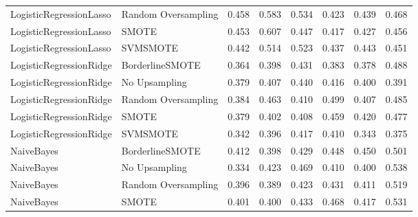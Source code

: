 \begin{tabular}{llllllll}
     LogisticRegressionLasso & Random Oversampling & 0.458 &                     0.583 &                 0.534 &                  0.423 &                                   0.439 &    0.468 \\
     LogisticRegressionLasso &               SMOTE & 0.453 &                     0.607 &                 0.447 &                  0.417 &                                   0.427 &    0.456 \\
     LogisticRegressionLasso &            SVMSMOTE & 0.442 &                     0.514 &                 0.523 &                  0.437 &                                   0.443 &    0.451 \\
     LogisticRegressionRidge &     BorderlineSMOTE & 0.364 &                     0.398 &                 0.431 &                  0.383 &                                   0.378 &    0.488 \\
     LogisticRegressionRidge &       No Upsampling & 0.379 &                     0.407 &                 0.440 &                  0.416 &                                   0.400 &    0.391 \\
     LogisticRegressionRidge & Random Oversampling & 0.384 &                     0.463 &                 0.410 &                  0.499 &                                   0.407 &    0.485 \\
     LogisticRegressionRidge &               SMOTE & 0.379 &                     0.402 &                 0.408 &                  0.459 &                                   0.420 &    0.477 \\
     LogisticRegressionRidge &            SVMSMOTE & 0.342 &                     0.396 &                 0.417 &                  0.410 &                                   0.343 &    0.375 \\
                  NaiveBayes &     BorderlineSMOTE & 0.412 &                     0.398 &                 0.429 &                  0.448 &                                   0.450 &    0.501 \\
                  NaiveBayes &       No Upsampling & 0.334 &                     0.423 &                 0.469 &                  0.410 &                                   0.400 &    0.538 \\
                  NaiveBayes & Random Oversampling & 0.396 &                     0.389 &                 0.423 &                  0.431 &                                   0.411 &    0.519 \\
                  NaiveBayes &               SMOTE & 0.401 &                     0.400 &                 0.433 &                  0.468 &                                   0.417 &    0.531 \\

\end{tabular}
